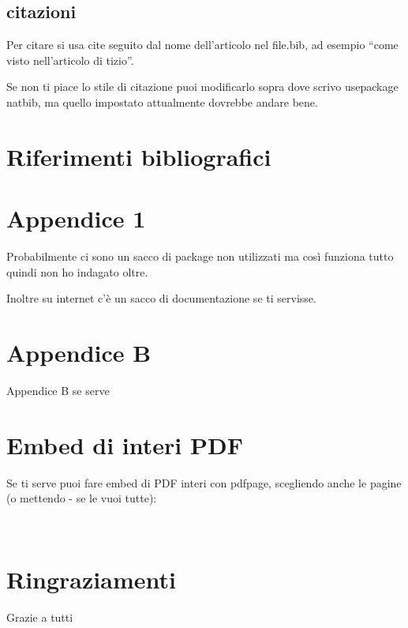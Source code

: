 \documentclass[12pt,a4paper,twoside]{book}
\begin{document}
\section{citazioni}
Per citare si usa cite seguito dal nome dell'articolo nel file.bib, ad esempio ``come visto nell'articolo di tizio\cite{greenwade93}''.

Se non ti piace lo stile di citazione puoi modificarlo sopra dove scrivo usepackage natbib, ma quello impostato attualmente dovrebbe andare bene.



\renewcommand{\bibsection}{}
\chapter*{Riferimenti bibliografici}

\newpage

\renewcommand{\appendixtocname}{Appendici}
\renewcommand{\appendixpagename}{Appendici}
{}
\begin{appendices}
\chapter{Appendice 1}
\label{Appendice:A}
Probabilmente ci sono un sacco di package non utilizzati ma così funziona tutto quindi non ho indagato oltre.

Inoltre su internet c'è un sacco di documentazione se ti servisse.
\chapter{Appendice B}
\label{Appendice:B}
Appendice B se serve

\chapter{Embed di interi PDF}
\label{Appendice:C}
Se ti serve puoi fare embed di PDF interi con pdfpage, scegliendo anche le pagine (o mettendo - se le vuoi tutte):


\end{appendices}

\newpage~\newpage
\chapter*{Ringraziamenti}
Grazie a tutti
\end{document}
